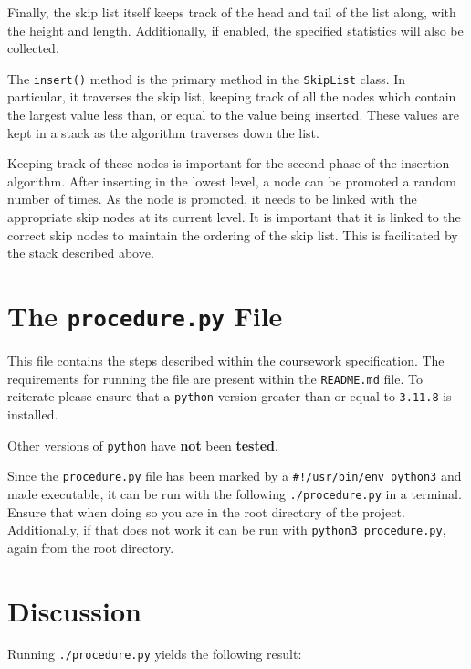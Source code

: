 \documentclass[article]{uom-coursework}
\begin{document}
Finally, the skip list itself keeps track of the head and tail
of the list along, with the height and length. Additionally, if
enabled, the specified statistics will also be collected.

The \texttt{insert()} method is the primary method in the
\texttt{SkipList} class. In particular, it traverses the skip
list, keeping track of all the nodes which contain the largest
value less than, or equal to the value being inserted. These
values are kept in a stack as the algorithm traverses down the
list.

Keeping track of these nodes is important for the second phase
of the insertion algorithm. After inserting in the lowest level,
a node can be promoted a random number of times. As the node is
promoted, it needs to be linked with the appropriate skip nodes
at its current level. It is important that it is linked to the
correct skip nodes to maintain the ordering of the skip list.
This is facilitated by the stack described above.

\section{The \texttt{procedure.py} File}

This file contains the steps described within the coursework
specification. The requirements for running the file are present
within the \texttt{README.md} file. To reiterate please ensure
that a \texttt{python} version greater than or equal to
\texttt{3.11.8} is installed. 

\begin{noteline}
Other versions of \texttt{python} have \textbf{not} been \textbf{tested}.
\end{noteline}

Since the \texttt{procedure.py} file has been marked by a
\texttt{\#!/usr/bin/env python3} and made executable, it can be
run with the following \texttt{./procedure.py} in a terminal.
Ensure that when doing so you are in the root directory of the
project. Additionally, if that does not work it can be run with
\texttt{python3 procedure.py}, again from the root directory.

\section{Discussion}

Running \texttt{./procedure.py} yields the following result:\label{list:stats}
\end{document}
